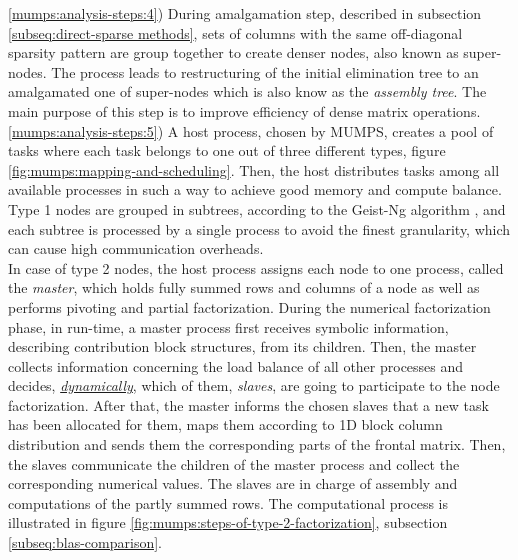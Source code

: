 \ref{mumps:analysis-steps:4}) During amalgamation step, described in subsection \ref{subseq:direct-sparse methods}, sets of columns with the same off-diagonal sparsity pattern are group together to create denser nodes, also known as super-nodes. The process leads to restructuring of the initial elimination tree to an amalgamated one of super-nodes which is also know as the \textit{assembly tree}. The main purpose of this step is to improve efficiency of dense matrix operations.\\



\ref{mumps:analysis-steps:5}) A host process, chosen by MUMPS, creates a pool of tasks where each task belongs to one out of three different types, figure \ref{fig:mumps:mapping-and-scheduling}. Then, the host distributes tasks among all available processes in such a way to achieve good memory and compute balance.\\

 
Type 1 nodes are grouped in subtrees, according to the Geist-Ng algorithm \cite{geist1989task}, and each subtree is processed by a single process to avoid the finest granularity, which can cause high communication overheads. \\


In case of type 2 nodes, the host process assigns each node to one process, called the \textit{master}, which holds fully summed rows and columns of a node as well as performs pivoting and partial factorization. During the numerical factorization phase, in run-time, a master process first receives symbolic information, describing  contribution block structures, from its children. Then, the master collects information concerning the load balance of all other processes and decides, \underline{\textit{dynamically}},  which of them, \textit{slaves}, are going to participate to the node factorization. After that, the master informs the chosen slaves that a new task has been allocated for them, maps them according to 1D block column distribution and sends them the corresponding parts of the frontal matrix. Then, the slaves communicate the children of the master process and collect the corresponding numerical values. The slaves are in charge of assembly and computations of the partly summed rows. The computational process is illustrated in figure \ref{fig:mumps:steps-of-type-2-factorization}, subsection \ref{subseq:blas-comparison}.\\


